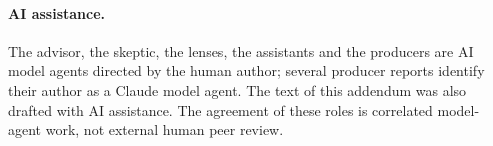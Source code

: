 \paragraph{AI assistance.} The advisor, the skeptic, the lenses, the
assistants and the producers are AI model agents directed by the human
author; several producer reports identify their author as a Claude model
agent. The text of this addendum was also drafted with AI assistance. The
agreement of these roles is correlated model-agent work, not external human
peer review.
